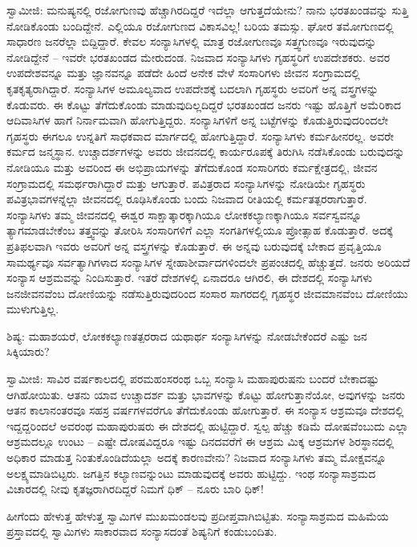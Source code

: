 ಸ್ವಾಮೀಜಿ: ಮನುಷ್ಯನಲ್ಲಿ ರಜೋಗುಣವು ಹೆಚ್ಚಾಗಿರದಿದ್ದರೆ ಇದೆಲ್ಲಾ ಆಗುತ್ತದೆಯೇನು? ನಾನು ಭರತಖಂಡವನ್ನು ಸುತ್ತಿ ನೋಡಿಕೊಂಡು ಬಂದಿದ್ದೇನೆ. ಎಲ್ಲಿಯೂ ರಜೋಗುಣದ ವಿಕಾಸವಿಲ್ಲ! ಬರಿಯ ತಮಸ್ಸು. ಘೋರ ತಮೋಗುಣದಲ್ಲಿ ಸಾಧಾರಣ ಜನರೆಲ್ಲಾ ಬಿದ್ದಿದ್ದಾರೆ. ಕೇವಲ ಸಂನ್ಯಾಸಿಗಳಲ್ಲಿ ಮಾತ್ರ ರಜೋಗುಣವೂ ಸತ್ತ್ವಗುಣವೂ ಇರುವುದನ್ನು ನೋಡಿದ್ದೇನೆ – ಇವರೇ ಭರತಖಂಡದ ಮೇರುದಂಡ. ನಿಜವಾದ ಸಂನ್ಯಾಸಿಗಳು ಗೃಹಸ್ಥರಿಗೆ ಉಪದೇಶಕರು. ಅವರ ಉಪದೇಶವನ್ನೂ ಮತ್ತು ಜ್ಞಾನವನ್ನೂ ಪಡೆದೇ ಹಿಂದೆ ಅನೇಕ ವೇಳೆ ಸಂಸಾರಿಗಳು ಜೀವನ ಸಂಗ್ರಾಮದಲ್ಲಿ ಕೃತಕೃತ್ಯರಾಗಿದ್ದಾರೆ. ಸಂನ್ಯಾಸಿಗಳ ಅಮೂಲ್ಯವಾದ ಉಪದೇಶಕ್ಕೆ ಬದಲಾಗಿ ಗೃಹಸ್ಥರು ಅವರಿಗೆ ಅನ್ನ ವಸ್ತ್ರಗಳನ್ನು ಕೊಡುವರು. ಈ ಕೊಟ್ಟು ತೆಗೆದುಕೊಂಡು ಮಾಡುವುದಿಲ್ಲದಿದ್ದರೆ ಭರತಖಂಡದ ಜನರು ಇಷ್ಟು ಹೊತ್ತಿಗೆ ಅಮೆರಿಕಾದ ಆದಿವಾಸಿಗಳ ಹಾಗೆ ನಿರ್ನಾಮವಾಗಿ ಹೋಗುತ್ತಿದ್ದರು. ಸಂನ್ಯಾಸಿಗಳಿಗೆ ಅನ್ನ ಬಟ್ಟೆಗಳನ್ನು ಕೊಡುತ್ತಿರುವುದರಿಂದಲೇ ಗೃಹಸ್ಥರು ಈಗಲೂ ಉನ್ನತಿಗೆ ಸಾಧಕವಾದ ಮಾರ್ಗದಲ್ಲಿ ಹೋಗುತ್ತಿದ್ದಾರೆ. ಸಂನ್ಯಾಸಿಗಳು ಕರ್ಮಹೀನರಲ್ಲ. ಅವರೇ ಕರ್ಮದ ಜನ್ಮಸ್ಥಾನ. ಉಚ್ಚಾದರ್ಶಗಳನ್ನು ಅವರು ಜೀವನದಲ್ಲಿ ಕಾರ್ಯರೂಪಕ್ಕೆ ತಿರುಗಿಸಿ ನಡೆಸಿಕೊಂಡು ಬರುವುದನ್ನು ನೋಡಿಯೂ ಮತ್ತು ಅವರಿಂದ ಈ ಅಭಿಪ್ರಾಯಗಳನ್ನು ತೆಗೆದುಕೊಂಡ ಸಂಸಾರಿಗರು ಕರ್ಮಕ್ಷೇತ್ರದಲ್ಲಿ, ಜೀವನ ಸಂಗ್ರಾಮದಲ್ಲಿ ಸಮರ್ಥರಾಗಿದ್ದಾರೆ ಮತ್ತು ಆಗುತ್ತಾರೆ. ಪವಿತ್ರರಾದ ಸಂನ್ಯಾಸಿಗಳನ್ನು ನೋಡಿಯೇ ಗೃಹಸ್ಥರು ಪವಿತ್ರಭಾವಗಳನ್ನೆಲ್ಲಾ ಜೀವನದಲ್ಲಿ ರೂಢಿಸಿಕೊಂಡು ಬಂದು ನಿಜವಾದ ರೀತಿಯಲ್ಲಿ ಕರ್ಮತತ್ಪರರಾಗುತ್ತಾರೆ. ಸಂನ್ಯಾಸಿಗಳು ತಮ್ಮ ಜೀವನದಲ್ಲಿ ಈಶ್ವರ ಸಾಕ್ಷಾತ್ಕಾರಕ್ಕಾಗಿಯೂ ಲೋಕಕಲ್ಯಾಣಕ್ಕಾಗಿಯೂ ಸರ್ವಸ್ವವನ್ನೂ ತ್ಯಾಗಮಾಡಬೇಕೆಂಬ ತತ್ತ್ವವನ್ನು ತೋರಿಸಿ ಸಂಸಾರಿಗಳಿಗೆ ಎಲ್ಲಾ ಸಂಗತಿಗಳಲ್ಲಿಯೂ ಪ್ರೋತ್ಸಾಹ ಕೊಡುತ್ತಾರೆ. ಅದಕ್ಕೆ ಪ್ರತಿಫಲವಾಗಿ ಇವರು ಅವರಿಗೆ ಅನ್ನ ವಸ್ತ್ರಗಳನ್ನು ಕೊಡುತ್ತಾರೆ. ಈ ಅನ್ನವು ಬರುವುದಕ್ಕೆ ಬೇಕಾದ ಪ್ರವೃತ್ತಿಯೂ ಸಾಮರ್ಥ್ಯವೂ ಸರ್ವತ್ಯಾಗಿಗಳಾದ ಸಂನ್ಯಾಸಿಗಳ ಸ್ನೇಹಾಶೀರ್ವಾದಗಳಿಂದಲೇ ಪ್ರಪಂಚದಲ್ಲಿ ಹೆಚ್ಚುತ್ತದೆ. ಜನರು ಅರಿಯದೆ ಸಂನ್ಯಾಸ ಆಶ್ರಮವನ್ನು ನಿಂದಿಸುತ್ತಾರೆ. ಇತರೆ ದೇಶಗಳಲ್ಲಿ ಏನಾದರೂ ಆಗಿರಲಿ, ಈ ದೇಶದಲ್ಲಿ ಸಂನ್ಯಾಸಿಗಳು ಜನಜೀವನವೆಂಬ ದೋಣಿಯನ್ನು ನಡೆಸುತ್ತಿರುವುದರಿಂದ ಸಂಸಾರ ಸಾಗರದಲ್ಲಿ ಗೃಹಸ್ಥರ ಜೀವಮಾನವೆಂಬ ದೋಣಿಯು ಮುಳುಗುತ್ತಿಲ್ಲ.

ಶಿಷ್ಯ: ಮಹಾಶಯರೆ, ಲೋಕಕಲ್ಯಾಣತತ್ಪರರಾದ ಯಥಾರ್ಥ ಸಂನ್ಯಾಸಿಗಳನ್ನು ನೋಡಬೇಕೆಂದರೆ ಎಷ್ಟು ಜನ ಸಿಕ್ಕಿಯಾರು?

ಸ್ವಾಮೀಜಿ: ಸಾವಿರ ವರ್ಷಕಾಲದಲ್ಲಿ ಪರಮಹಂಸರಂಥ ಒಬ್ಬ ಸಂನ್ಯಾಸಿ ಮಹಾಪುರುಷನು ಬಂದರೆ ಬೇಕಾದಷ್ಟು ಆಗಿಹೋಯಿತು. ಆತನು ಯಾವ ಉಚ್ಚಾದರ್ಶ ಮತ್ತು ಭಾವಗಳನ್ನು ಕೊಟ್ಟು ಹೋಗುತ್ತಾನೆಯೋ, ಅವುಗಳನ್ನು ಜನರು ಆತನ ಕಾಲಾನಂತರವೂ ಸಹಸ್ರ ವರ್ಷಗಳವರೆಗೂ ತೆಗೆದುಕೊಂಡು ಹೋಗುತ್ತಾರೆ. ಈ ಸಂನ್ಯಾಸ ಆಶ್ರಮವೂ ದೇಶದಲ್ಲಿ ಇದ್ದದ್ದರಿಂದಲೆ ಅವರಂಥ ಮಹಾಪುರುಷರು ಈ ದೇಶದಲ್ಲಿ ಹುಟ್ಟಿದ್ದಾರೆ. ಸ್ವಲ್ಪ ಹೆಚ್ಚು ಕಡಿಮೆ ದೋಷವೆಂಬುದು ಎಲ್ಲಾ ಆಶ್ರಮದಲ್ಲೂ ಉಂಟು – ಎಷ್ಟೇ ದೋಷವಿದ್ದರೂ ಇಷ್ಟು ದಿನದವರೆಗೆ ಈ ಆಶ್ರಮ ಮಿಕ್ಕ ಆಶ್ರಮಗಳ ಶಿರಸ್ಥಾನದಲ್ಲಿ ಅಧಿಕಾರ ಮಾಡುತ್ತ ನಿಂತುಕೊಂಡಿದೆಯಲ್ಲಾ ಅದಕ್ಕೆ ಕಾರಣವೇನು? ನಿಜವಾದ ಸಂನ್ಯಾಸಿಗಳು ತಮ್ಮ ಮೋಕ್ಷವನ್ನೂ ಅಲಕ್ಷ್ಯಮಾಡಿಬಿಟ್ಟರು. ಜಗತ್ತಿನ ಕಲ್ಯಾಣವನ್ನುಂಟು ಮಾಡುವುದಕ್ಕೆ ಅವರು ಹುಟ್ಟಿದ್ದು. ಇಂಥ ಸಂನ್ಯಾಸಾಶ್ರಮದ ವಿಚಾರದಲ್ಲಿ ನೀವು ಕೃತಜ್ಞರಾಗಿರದಿದ್ದರೆ ನಿಮಗೆ ಧಿಕ್ – ನೂರು ಬಾರಿ ಧಿಕ್!

ಹೀಗೆಂದು ಹೇಳುತ್ತ ಹೇಳುತ್ತ ಸ್ವಾಮಿಗಳ ಮುಖಮಂಡಲವು ಪ್ರದೀಪ್ತವಾಗಿಬಿಟ್ಟಿತು. ಸಂನ್ಯಾಸಾಶ್ರಮದ ಮಹಿಮೆಯ ಪ್ರಸ್ತಾವದಲ್ಲಿ ಸ್ವಾಮಿಗಳು ಸಾಕಾರವಾದ ಸಂನ್ಯಾಸದಂತೆ ಶಿಷ್ಯನಿಗೆ ಕಂಡುಬಂದಿತು.

